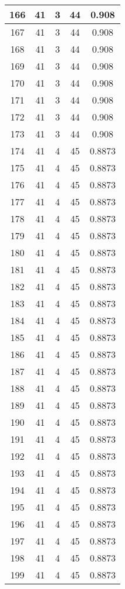 \documentclass[letterpaper, 12pt]{article}
\begin{document}
\begin{longtable}{|c|c|c|c|c|}
\hline
166 & 41 & 3 & 44 & 0.908 \\
\hline
167 & 41 & 3 & 44 & 0.908 \\
\hline
168 & 41 & 3 & 44 & 0.908 \\
\hline
169 & 41 & 3 & 44 & 0.908 \\
\hline
170 & 41 & 3 & 44 & 0.908 \\
\hline
171 & 41 & 3 & 44 & 0.908 \\
\hline
172 & 41 & 3 & 44 & 0.908 \\
\hline
173 & 41 & 3 & 44 & 0.908 \\
\hline
174 & 41 & 4 & 45 & 0.8873 \\
\hline
175 & 41 & 4 & 45 & 0.8873 \\
\hline
176 & 41 & 4 & 45 & 0.8873 \\
\hline
177 & 41 & 4 & 45 & 0.8873 \\
\hline
178 & 41 & 4 & 45 & 0.8873 \\
\hline
179 & 41 & 4 & 45 & 0.8873 \\
\hline
180 & 41 & 4 & 45 & 0.8873 \\
\hline
181 & 41 & 4 & 45 & 0.8873 \\
\hline
182 & 41 & 4 & 45 & 0.8873 \\
\hline
183 & 41 & 4 & 45 & 0.8873 \\
\hline
184 & 41 & 4 & 45 & 0.8873 \\
\hline
185 & 41 & 4 & 45 & 0.8873 \\
\hline
186 & 41 & 4 & 45 & 0.8873 \\
\hline
187 & 41 & 4 & 45 & 0.8873 \\
\hline
188 & 41 & 4 & 45 & 0.8873 \\
\hline
189 & 41 & 4 & 45 & 0.8873 \\
\hline
190 & 41 & 4 & 45 & 0.8873 \\
\hline
191 & 41 & 4 & 45 & 0.8873 \\
\hline
192 & 41 & 4 & 45 & 0.8873 \\
\hline
193 & 41 & 4 & 45 & 0.8873 \\
\hline
194 & 41 & 4 & 45 & 0.8873 \\
\hline
195 & 41 & 4 & 45 & 0.8873 \\
\hline
196 & 41 & 4 & 45 & 0.8873 \\
\hline
197 & 41 & 4 & 45 & 0.8873 \\
\hline
198 & 41 & 4 & 45 & 0.8873 \\
\hline
199 & 41 & 4 & 45 & 0.8873 \\
\hline
\end{longtable}
\end{document}

